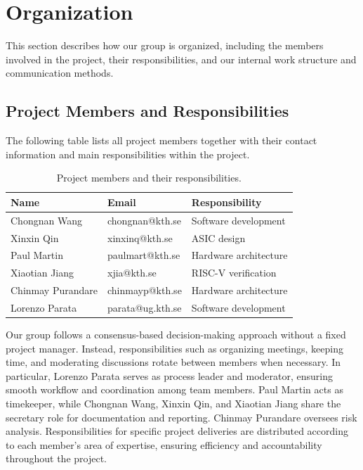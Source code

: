 \documentclass[10pt]{article}
\begin{document}
\section{Organization}

This section describes how our group is organized, including the members involved in the project, their responsibilities, and our internal work structure and communication methods.

\subsection{Project Members and Responsibilities}

The following table lists all project members together with their contact information and main responsibilities within the project.

\begin{table}[h!]
\centering
\begin{tabular}{|l|l|l|}
\hline
\textbf{Name} & \textbf{Email} & \textbf{Responsibility} \\ \hline
Chongnan Wang & chongnan@kth.se & Software development \\ \hline
Xinxin Qin & xinxinq@kth.se & ASIC design \\ \hline
Paul Martin & paulmart@kth.se & Hardware architecture \\ \hline
Xiaotian Jiang & xjia@kth.se & RISC-V verification \\ \hline
Chinmay Purandare & chinmayp@kth.se & Hardware architecture \\ \hline
Lorenzo Parata & parata@ug.kth.se & Software development \\ \hline
\end{tabular}
\caption{Project members and their responsibilities.}
\end{table}

Our group follows a consensus-based decision-making approach without a fixed project manager. Instead, responsibilities such as organizing meetings, keeping time, and moderating discussions rotate between members when necessary.  
In particular, Lorenzo Parata serves as process leader and moderator, ensuring smooth workflow and coordination among team members. Paul Martin acts as timekeeper, while Chongnan Wang, Xinxin Qin, and Xiaotian Jiang share the secretary role for documentation and reporting. Chinmay Purandare oversees risk analysis.  
Responsibilities for specific project deliveries are distributed according to each member’s area of expertise, ensuring efficiency and accountability throughout the project.
\end{document}
